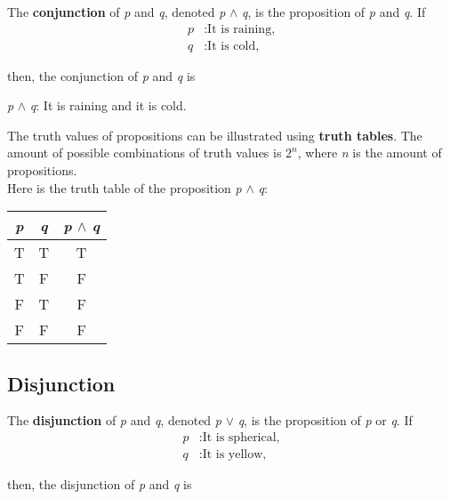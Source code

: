 The \textbf{conjunction} of \textit{p} and \textit{q}, denoted \textit{p} $\land$ \textit{q}, is the proposition of \textit{p} and \textit{q}.  If 
\begin{align*}
    \textit{p}&: \text{It is raining,}\\
    \textit{q}&: \text{It is cold,}
\end{align*}

then, the conjunction of \textit{p} and \textit{q} is

\begin{center}
    \textit{p} $\land$ \textit{q}: It is raining and it is cold.
\end{center}


The truth values of propositions can be illustrated using \textbf{truth tables}.  The amount of possible combinations of truth values is $2^n$, where \textit{n} is the amount of propositions.\\

Here is the truth table of the proposition \textit{p} $\land$ \textit{q}:

\begin{table}[h]
\centering
\begin{tabular}{|c|c|c|}
\hline
\textit{p} & \textit{q} & \textit{p} $\land$ \textit{q} \\ \hline
T          & T          & T       \\ \hline
T          & F          & F       \\ \hline
F          & T          & F       \\ \hline
F          & F          & F       \\ \hline
\end{tabular}
\end{table}

\subsection*{Disjunction}

The \textbf{disjunction} of \textit{p} and \textit{q}, denoted \textit{p} $\vee$ \textit{q}, is the proposition of \textit{p} or \textit{q}.  If 
\begin{align*}
    \textit{p}&: \text{It is spherical,}\\
    \textit{q}&: \text{It is yellow,}
\end{align*}

then, the disjunction of \textit{p} and \textit{q} is

